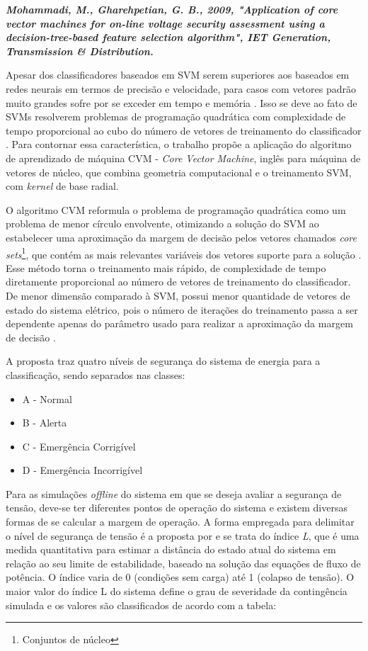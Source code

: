 \documentclass[12pt,oneside,a4paper,chapter=TITLE,section=TITLE,sumario=tradicional,english,brazil]{abntex2}
\begin{document}
\textbf{\textit{Mohammadi, M., Gharehpetian, G. B., 2009, "Application of core vector machines for on-line voltage security assessment using a decision-tree-based feature selection algorithm", IET Generation, Transmission \& Distribution.}}\par
	Apesar dos classificadores baseados em SVM serem superiores aos baseados em redes neurais em termos de precisão e velocidade, para casos com vetores padrão muito grandes sofre por se exceder em tempo e memória \cite{gharehpetian2008}. Isso se deve ao fato de SVMs resolverem problemas de programação quadrática com complexidade de tempo proporcional ao cubo do número de vetores de treinamento do classificador \cite{Burges1998}. Para contornar essa característica, o trabalho propõe a aplicação do algoritmo de aprendizado de máquina CVM - \textit{Core Vector Machine}, inglês para máquina de vetores de núcleo, que combina geometria computacional e o treinamento SVM, com \textit{kernel} de base radial.\par
	O algoritmo CVM reformula o problema de programação quadrática como um problema de menor círculo envolvente, otimizando a solução do SVM ao estabelecer uma aproximação da margem de decisão  pelos vetores chamados \textit{core sets}\footnote{Conjuntos de núcleo}, que contém as mais relevantes variáveis dos vetores suporte para a solução \cite{tsang2005}. Esse método torna o treinamento mais rápido, de complexidade de tempo diretamente proporcional ao número de vetores de treinamento do classificador. De menor dimensão comparado à SVM, possui menor quantidade de vetores de estado do sistema elétrico, pois o número de iterações do treinamento passa a ser dependente apenas do parâmetro usado para realizar a aproximação da margem de decisão \cite{tsang2006}.\par
	A proposta traz quatro níveis de segurança do sistema de energia para a classificação, sendo separados nas classes:
	\begin{itemize}
	\item A - Normal
	\item B - Alerta
	\item C - Emergência Corrigível
	\item D - Emergência Incorrigível
	\end{itemize}
	\par 
	Para as simulações \textit{offline} do sistema em que se deseja avaliar a segurança de tensão, deve-se ter diferentes pontos de operação do sistema e existem diversas formas de se calcular a margem de operação. A forma empregada para delimitar o nível de segurança de tensão é a proposta por \textcite{kessel1986} e se trata do índice \textit{L}, que é uma medida quantitativa para estimar a distância do estado atual do sistema em relação ao seu limite de estabilidade, baseado na solução das equações de fluxo de potência. O índice varia de 0 (condições sem carga) até 1 (colapso de tensão). O maior valor do índice L do sistema define o grau de severidade da contingência simulada e os valores são classificados de acordo com a tabela:\par
\end{document}
